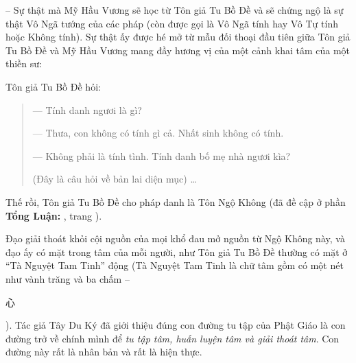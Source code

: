 -- Sự thật mà Mỹ Hầu Vương sẽ học từ Tôn giả Tu Bồ Đề và sẽ chứng ngộ là sự thật Vô Ngã tướng của các pháp (còn được gọi là Vô Ngã tính hay Vô Tự tính hoặc Không tính). Sự thật ấy được hé mở từ mẫu đối thoại đầu tiên giữa Tôn giả Tu Bồ Đề và Mỹ Hầu Vương mang đầy hương vị của một cảnh khai tâm của một thiền sư:

Tôn giả Tu Bồ Đề hỏi:

\begin{quote}
--- Tính danh ngươi là gì?

--- Thưa, con không có tính gì cả. Nhất sinh không có tính.

--- Không phải là tính tình. Tính danh bố mẹ nhà ngươi kìa?

(Đây là câu hỏi về bản lai diện mục) \ldots
\end{quote}

Thế rồi, Tôn giả Tu Bồ Đề cho pháp danh là Tôn Ngộ Không (đã đề cập ở phần {\bf Tổng Luận:} , trang \pageref{sub:ve_ton_ngo_khong}).

Đạo giải thoát khỏi cội nguồn của mọi khổ đau mở nguồn từ Ngộ Không này, và đạo ấy có mặt trong tâm của mỗi người, như Tôn giả Tu Bồ Đề thường có mặt ở ``Tà Nguyệt Tam Tinh'' động (Tà Nguyệt Tam Tinh là chữ tâm gồm có một nét như vành trăng và ba chấm -- \begin{CJK*}{UTF8}{bkai}心\end{CJK*}). Tác giả Tây Du Ký đã giới thiệu đúng con đường tu tập của Phật Giáo là con đường trở về chính mình để \emph{tu tập tâm, huấn luyện tâm và giải thoát tâm}. Con đường này rất là nhân bản và rất là hiện thực.

\hrulefill

